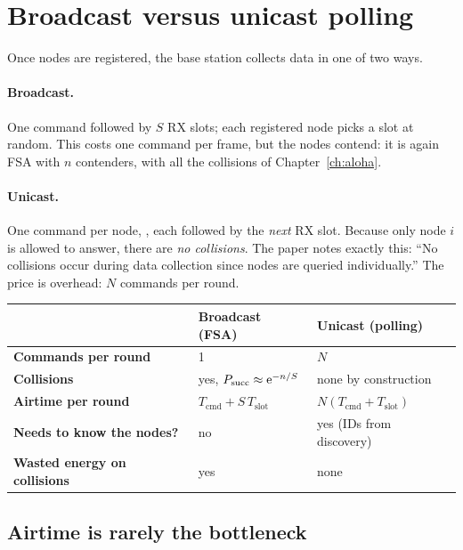 \section{Broadcast versus unicast polling}
\label{sec:bcvsuc}

Once nodes are registered, the base station collects data in one of two ways.

\paragraph{Broadcast.} One command  followed by $S$ RX slots; each registered node picks a slot at random. This costs one command per frame, but the nodes contend: it is again FSA with $n$ contenders, with all the collisions of Chapter~\ref{ch:aloha}.

\paragraph{Unicast.} One command per node, , each followed by the \emph{next} RX slot. Because only node $i$ is allowed to answer, there are \emph{no collisions}. The paper notes exactly this: ``No collisions occur during data collection since nodes are queried individually.'' The price is overhead: $N$ commands per round.

\begin{center}
\small
\renewcommand{\arraystretch}{1.15}
\begin{tabularx}{\linewidth}{@{}>{\sffamily\bfseries}p{3.0cm}XX@{}}
\toprule
 & Broadcast (FSA) & Unicast (polling)\\
\midrule
Commands per round & 1 & $N$\\
Collisions & yes, $P_{\mathrm{succ}}\approx\mathrm{e}^{-n/S}$ & none by construction\\
Airtime per round & $T_{\mathrm{cmd}}+S\,T_{\mathrm{slot}}$ & $N(T_{\mathrm{cmd}}+T_{\mathrm{slot}})$\\
Needs to know the nodes? & no & yes (IDs from discovery)\\
Wasted energy on collisions & yes & none\\
\bottomrule
\end{tabularx}
\end{center}

\subsection{Airtime is rarely the bottleneck}

